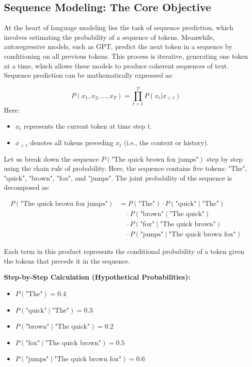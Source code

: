 \subsection{Sequence Modeling: The Core Objective}
\begin{flushleft}
    \large At the heart of language modeling lies the task of sequence prediction, which involves estimating the probability of a sequence of tokens. Meanwhile, autoregressive models, such as GPT, predict the next token in a sequence by conditioning on all previous tokens. This process is iterative, generating one token at a time, which allows these models to produce coherent sequences of text. Sequence prediction can be mathematically expressed as:
    
    \[
    P(x_1, x_2, \dots, x_T) = \prod_{t=1}^T P(x_t | x_{<t})
    \]
    Here:
    \begin{itemize}
        \item \(x_t\) represents the current token at time step \(t\).
        \item \(x_{<t}\) denotes all tokens preceding \(x_t\) (i.e., the context or history).
    \end{itemize}

    Let us break down the sequence \(P(\text{"The quick brown fox jumps"})\) step by step using the chain rule of probability. Here, the sequence contains five tokens: \(\text{"The"}\), \(\text{"quick"}\), \(\text{"brown"}\), \(\text{"fox"}\), and \(\text{"jumps"}\). The joint probability of the sequence is decomposed as:

    \[
    \begin{aligned}
    P(\text{"The quick brown fox jumps"}) 
    & = P(\text{"The"}) \cdot P(\text{"quick"} \mid \text{"The"}) \\
    & \quad \cdot P(\text{"brown"} \mid \text{"The quick"}) \\
    & \quad \cdot P(\text{"fox"} \mid \text{"The quick brown"}) \\
    & \quad \cdot P(\text{"jumps"} \mid \text{"The quick brown fox"})
    \end{aligned}
    \]


    Each term in this product represents the conditional probability of a token given the tokens that precede it in the sequence. \break

    \textbf{Step-by-Step Calculation (Hypothetical Probabilities):}
    \begin{itemize}
        \item \(P(\text{"The"}) = 0.4\)
        \item \(P(\text{"quick"} \mid \text{"The"}) = 0.3\)
        \item \(P(\text{"brown"} \mid \text{"The quick"}) = 0.2\)
        \item \(P(\text{"fox"} \mid \text{"The quick brown"}) = 0.5\)
        \item \(P(\text{"jumps"} \mid \text{"The quick brown fox"}) = 0.6\)
    \end{itemize}


\end{flushleft}
